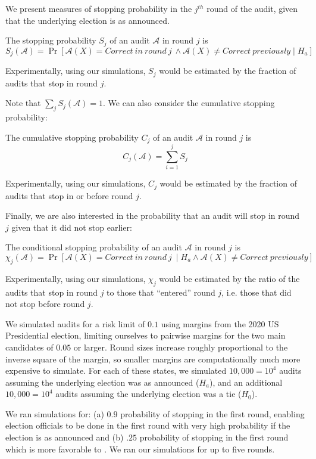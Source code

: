 We present measures of stopping probability in the $j^{th}$ round of the audit, given that the underlying election is as announced.
\begin{definition}
The stopping probability $S_j$ of an audit $\mathcal{A}$ in round $j$ is 
$$S_j(\mathcal{A})=\Pr[\mathcal{A}(X)=Correct ~in~round~j~\land \mathcal{A}(X) \neq Correct ~previously \mid H_a]$$
\end{definition}
Experimentally, using our simulations, $S_j$ would be estimated by the fraction of audits that stop in round $j$. 

Note that $\sum _j S_j(\mathcal{A})=1$. We can also consider the cumulative stopping probability: 
\begin{definition}
The cumulative stopping probability $C_j$ of an audit $\mathcal{A}$ in round $j$ is 
$$C_j(\mathcal{A})= \sum_{i=1}^j S_j$$
\end{definition}
Experimentally, using our simulations, $C_j$ would be estimated by the fraction of audits that stop in or before round $j$. 

Finally, we are also interested in the probability that an audit will stop in round $j$ given that it did not stop earlier: 
\begin{definition}
The conditional stopping probability  of an audit $\mathcal{A}$ in round $j$ is 
$$\chi_j (\mathcal{A})=\Pr[\mathcal{A}(X)=Correct ~in~round~j~\mid H_a \land \mathcal{A}(X) \neq Correct ~previously]$$
\end{definition}
Experimentally, using our simulations, $\chi_j$ would be estimated by the ratio of the audits that stop in round $j$ to those that ``entered'' round $j$, i.e. those that did not stop before round $j$. 

We simulated audits for a risk limit of $0.1$ using margins from the 2020 US Presidential election, limiting ourselves to pairwise margins for the two main candidates of $0.05$ or larger. Round sizes increase roughly proportional to the inverse
square of the margin, so 
smaller margins are computationally much more expensive to simulate.
For each of these states, we simulated 
$10,000=10^4$ audits assuming the underlying election was as announced ($H_a$),  
and an additional $10,000=10^4$ audits assuming the underlying election was a tie ($H_0$). 

We ran simulations for: (a) $0.9$ probability of stopping in the first round, enabling election officials to be done in the first round with very high probability if the election is as announced and (b) $.25$ probability of stopping in the first round which is more favorable to \BRAVO. We ran our simulations for up to five rounds. 

